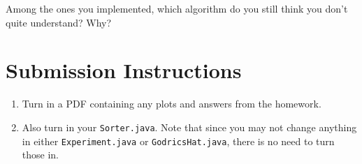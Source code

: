 \documentclass{homework}
\begin{document}
\question Among the ones you implemented, which algorithm do you still think
you don't quite understand? Why?

\section*{Submission Instructions}

\begin{enumerate}
  \item Turn in a PDF containing any plots and answers from the homework.
  \item Also turn in your \texttt{Sorter.java}. Note that since you may
        not change anything in either \texttt{Experiment.java} or
        \texttt{GodricsHat.java}, there is no need to turn those in.
\end{enumerate}
\end{document}

